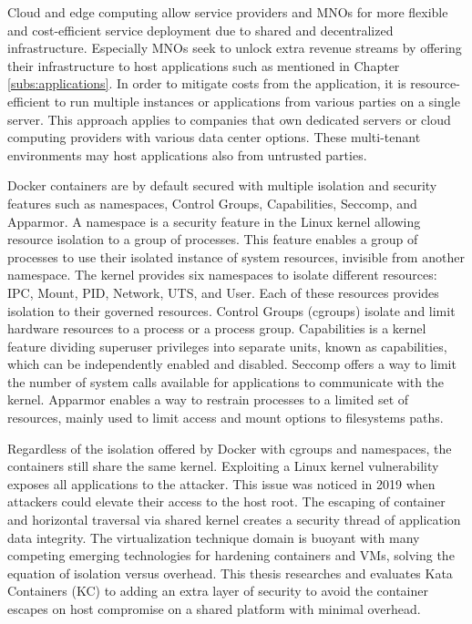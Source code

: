 Cloud and edge computing allow service providers and MNOs for more flexible and cost-efficient service deployment due to shared and decentralized infrastructure. Especially MNOs seek to unlock extra revenue streams by offering their infrastructure to host applications such as mentioned in Chapter \ref{subs:applications}. In order to mitigate costs from the application, it is resource-efficient to run multiple instances or applications from various parties on a single server. This approach applies to companies that own dedicated servers or cloud computing providers with various data center options. These multi-tenant environments may host applications also from untrusted parties.

Docker containers are by default secured with multiple isolation and security features such as namespaces, Control Groups, Capabilities, Seccomp, and Apparmor. A namespace is a security feature in the Linux kernel allowing resource isolation to a group of processes. This feature enables a group of processes to use their isolated instance of system resources, invisible from another namespace. The kernel provides six namespaces to isolate different resources: IPC, Mount, PID, Network, UTS, and User. Each of these resources provides isolation to their governed resources. Control Groups (cgroups) isolate and limit hardware resources to a process or a process group. Capabilities is a kernel feature dividing superuser privileges into separate units, known as capabilities, which can be independently enabled and disabled. Seccomp offers a way to limit the number of system calls available for applications to communicate with the kernel. Apparmor enables a way to restrain processes to a limited set of resources, mainly used to limit access and mount options to filesystems paths. \cite{Flauzac2020}

Regardless of the isolation offered by Docker with cgroups and namespaces, the containers still share the same kernel. Exploiting a Linux kernel vulnerability exposes all applications to the attacker. This issue was noticed in 2019 \cite{CVE-2020-14386}\cite{CVE-2019-5736} when attackers could elevate their access to the host root. The escaping of container and horizontal traversal via shared kernel creates a security thread of application data integrity. The virtualization technique domain is buoyant with many competing emerging technologies for hardening containers and VMs, solving the equation of isolation versus overhead. This thesis researches and evaluates Kata Containers (KC) to adding an extra layer of security to avoid the container escapes on host compromise on a shared platform with minimal overhead. \cite{EdgeComputing5G}


